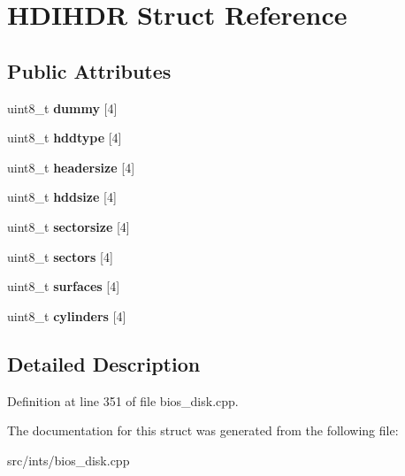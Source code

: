 \hypertarget{structHDIHDR}{\section{H\-D\-I\-H\-D\-R Struct Reference}
\label{structHDIHDR}
}
\subsection*{Public Attributes}
\begin{DoxyCompactItemize}
\item 
\hypertarget{structHDIHDR_ae41c262463f3201e383a1c9390ae901c}{uint8\-\_\-t {\bfseries dummy} \mbox{[}4\mbox{]}}\label{structHDIHDR_ae41c262463f3201e383a1c9390ae901c}

\item 
\hypertarget{structHDIHDR_ab51b532bb68c10726d57f635bb77dc4d}{uint8\-\_\-t {\bfseries hddtype} \mbox{[}4\mbox{]}}\label{structHDIHDR_ab51b532bb68c10726d57f635bb77dc4d}

\item 
\hypertarget{structHDIHDR_ab03e0699debea645f1ba0571ddedf82a}{uint8\-\_\-t {\bfseries headersize} \mbox{[}4\mbox{]}}\label{structHDIHDR_ab03e0699debea645f1ba0571ddedf82a}

\item 
\hypertarget{structHDIHDR_a552e396437dfc751af75133fc9abd875}{uint8\-\_\-t {\bfseries hddsize} \mbox{[}4\mbox{]}}\label{structHDIHDR_a552e396437dfc751af75133fc9abd875}

\item 
\hypertarget{structHDIHDR_a2dc5f3e10810fa24566f03f8b26dab4f}{uint8\-\_\-t {\bfseries sectorsize} \mbox{[}4\mbox{]}}\label{structHDIHDR_a2dc5f3e10810fa24566f03f8b26dab4f}

\item 
\hypertarget{structHDIHDR_aa8388e85e4ef3007467293eea28e0082}{uint8\-\_\-t {\bfseries sectors} \mbox{[}4\mbox{]}}\label{structHDIHDR_aa8388e85e4ef3007467293eea28e0082}

\item 
\hypertarget{structHDIHDR_a74ee482205337db4273020bef91f3056}{uint8\-\_\-t {\bfseries surfaces} \mbox{[}4\mbox{]}}\label{structHDIHDR_a74ee482205337db4273020bef91f3056}

\item 
\hypertarget{structHDIHDR_a61459f45085bcacd0325cc64862fc396}{uint8\-\_\-t {\bfseries cylinders} \mbox{[}4\mbox{]}}\label{structHDIHDR_a61459f45085bcacd0325cc64862fc396}

\end{DoxyCompactItemize}


\subsection{Detailed Description}


Definition at line 351 of file bios\-\_\-disk.\-cpp.



The documentation for this struct was generated from the following file\-:\begin{DoxyCompactItemize}
\item 
src/ints/bios\-\_\-disk.\-cpp\end{DoxyCompactItemize}
